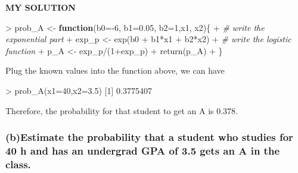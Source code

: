 \documentclass[
]{article}
\newenvironment{Shaded}{\begin{snugshade}}{\end{snugshade}}
\newcommand{\AttributeTok}[1]{\textcolor[rgb]{0.77,0.63,0.00}{#1}}
\newcommand{\CommentTok}[1]{\textcolor[rgb]{0.56,0.35,0.01}{\textit{#1}}}
\newcommand{\ControlFlowTok}[1]{\textcolor[rgb]{0.13,0.29,0.53}{\textbf{#1}}}
\newcommand{\DecValTok}[1]{\textcolor[rgb]{0.00,0.00,0.81}{#1}}
\newcommand{\FloatTok}[1]{\textcolor[rgb]{0.00,0.00,0.81}{#1}}
\newcommand{\FunctionTok}[1]{\textcolor[rgb]{0.00,0.00,0.00}{#1}}
\newcommand{\NormalTok}[1]{#1}
\newcommand{\OtherTok}[1]{\textcolor[rgb]{0.56,0.35,0.01}{#1}}
\newcommand{\SpecialCharTok}[1]{\textcolor[rgb]{0.00,0.00,0.00}{#1}}
\begin{document}
\textbf{MY SOLUTION}

\begin{Shaded}
\begin{Highlighting}[]
\SpecialCharTok{\textgreater{}}\NormalTok{ prob\_A  }\OtherTok{\textless{}{-}} \ControlFlowTok{function}\NormalTok{(}\AttributeTok{b0=}\SpecialCharTok{{-}}\DecValTok{6}\NormalTok{, }\AttributeTok{b1=}\FloatTok{0.05}\NormalTok{, }\AttributeTok{b2=}\DecValTok{1}\NormalTok{,x1, x2)\{}
\SpecialCharTok{+}   \CommentTok{\# write the exponential part}
\SpecialCharTok{+}\NormalTok{   exp\_p }\OtherTok{\textless{}{-}} \FunctionTok{exp}\NormalTok{(b0 }\SpecialCharTok{+}\NormalTok{ b1}\SpecialCharTok{*}\NormalTok{x1 }\SpecialCharTok{+}\NormalTok{ b2}\SpecialCharTok{*}\NormalTok{x2)}
\SpecialCharTok{+}   \CommentTok{\# write the logistic function}
\SpecialCharTok{+}\NormalTok{   p\_A }\OtherTok{\textless{}{-}}\NormalTok{ exp\_p}\SpecialCharTok{/}\NormalTok{(}\DecValTok{1}\SpecialCharTok{+}\NormalTok{exp\_p)}
\SpecialCharTok{+}   \FunctionTok{return}\NormalTok{(p\_A)}
\SpecialCharTok{+}\NormalTok{ \}}
\end{Highlighting}
\end{Shaded}

Plug the known values into the function above, we can have

\begin{Shaded}
\begin{Highlighting}[]
\SpecialCharTok{\textgreater{}} \FunctionTok{prob\_A}\NormalTok{(}\AttributeTok{x1=}\DecValTok{40}\NormalTok{,}\AttributeTok{x2=}\FloatTok{3.5}\NormalTok{)}
\NormalTok{[}\DecValTok{1}\NormalTok{] }\FloatTok{0.3775407}
\end{Highlighting}
\end{Shaded}

Therefore, the probability for that student to get an A is 0.378.

\hypertarget{bestimate-the-probability-that-a-student-who-studies-for-40-h-and-has-an-undergrad-gpa-of-3.5-gets-an-a-in-the-class.}{%
\subsubsection{\texorpdfstring{\textbf{(b)Estimate the probability that
a student who studies for 40 h and has an undergrad GPA of 3.5 gets an A
in the
class.}}{(b)Estimate the probability that a student who studies for 40 h and has an undergrad GPA of 3.5 gets an A in the class.}}\label{bestimate-the-probability-that-a-student-who-studies-for-40-h-and-has-an-undergrad-gpa-of-3.5-gets-an-a-in-the-class.}}
\end{document}
